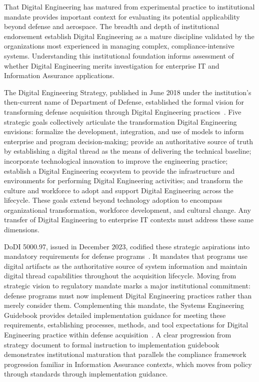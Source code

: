 That Digital Engineering has matured from experimental practice to institutional mandate provides important context for evaluating its potential applicability beyond defense and aerospace. The breadth and depth of institutional endorsement establish Digital Engineering as a mature discipline validated by the organizations most experienced in managing complex, compliance-intensive systems. Understanding this institutional foundation informs assessment of whether Digital Engineering merits investigation for enterprise IT and Information Assurance applications.

The Digital Engineering Strategy, published in June 2018 under the institution's then-current name of Department of Defense, established the formal vision for transforming defense acquisition through Digital Engineering practices~\parencite{DoD_DE_Strategy_2018}. Five strategic goals collectively articulate the transformation Digital Engineering envisions: formalize the development, integration, and use of models to inform enterprise and program decision-making; provide an authoritative source of truth by establishing a digital thread as the means of delivering the technical baseline; incorporate technological innovation to improve the engineering practice; establish a Digital Engineering ecosystem to provide the infrastructure and environments for performing Digital Engineering activities; and transform the culture and workforce to adopt and support Digital Engineering across the lifecycle. These goals extend beyond technology adoption to encompass organizational transformation, workforce development, and cultural change. Any transfer of Digital Engineering to enterprise IT contexts must address these same dimensions.

DoDI 5000.97, issued in December 2023, codified these strategic aspirations into mandatory requirements for defense programs~\parencite{DoDI_5000_97_2023}. It mandates that programs use digital artifacts as the authoritative source of system information and maintain digital thread capabilities throughout the acquisition lifecycle. Moving from strategic vision to regulatory mandate marks a major institutional commitment: defense programs must now implement Digital Engineering practices rather than merely consider them. Complementing this mandate, the Systems Engineering Guidebook provides detailed implementation guidance for meeting these requirements, establishing processes, methods, and tool expectations for Digital Engineering practice within defense acquisition~\parencite{DoD_Engineering_2022}. A clear progression from strategy document to formal instruction to implementation guidebook demonstrates institutional maturation that parallels the compliance framework progression familiar in Information Assurance contexts, which moves from policy through standards through implementation guidance.

